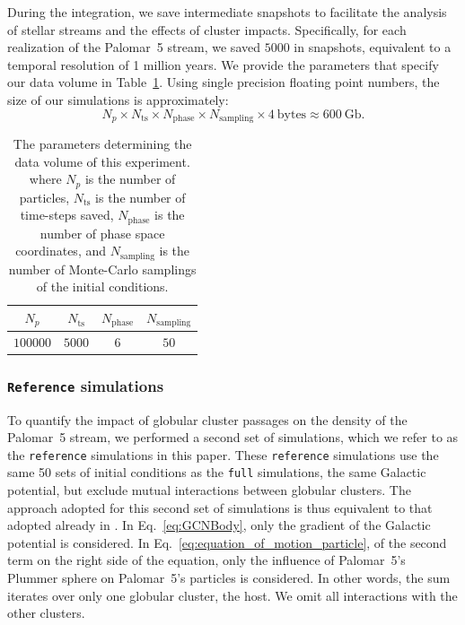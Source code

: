 \documentclass{aa}
\begin{document}
      During the integration, we save intermediate snapshots to facilitate the analysis of stellar streams and the effects of cluster impacts. Specifically, for each realization of the Palomar~5 stream, we saved $5000$ in snapshots, equivalent to a temporal resolution of 1 million years. We provide the parameters that specify our data volume in Table~\ref{tab:data_volume}. Using single precision floating point numbers, the size of our simulations is approximately:
    \begin{equation} \label{eq:data_volume_estimate}
      N_p \times N_{\textrm{ts}}\times N_{\textrm{phase}}\times N_{\textrm{sampling}} \times 4~\textrm{bytes}\approx 600~\textrm{Gb}.
    \end{equation}

    \begin{table}[h]
      \centering
      \begin{tabular}{|c|c|c|c|}
          \hline
          $N_p$ & $N_{\textrm{ts}}$ & $N_{\textrm{phase}}$ & $N_{\textrm{sampling}}$ \\
          \hline
          $100000$ & $5000$ & $6$ & $50$ \\
          \hline
      \end{tabular}
      \caption{The parameters determining the data volume of this experiment. where $N_p$  is the number of particles, $N_{\textrm{ts}}$ is the number of time-steps saved, $N_{\textrm{phase}}$ is the number of phase space coordinates, and $N_{\textrm{sampling}}$ is the number of Monte-Carlo samplings of the initial conditions.}
      \label{tab:data_volume}
    \end{table}

  \subsubsection{ \texttt{Reference} simulations}

    To quantify the impact of globular cluster passages on the density of the Palomar~5 stream, we performed a second set of simulations, which we refer to as the \texttt{reference} simulations in this paper.  These \texttt{reference} simulations use the same 50 sets of initial conditions as the \texttt{full} simulations, the same Galactic potential, but exclude mutual interactions between globular clusters. The approach adopted for this second set of simulations is thus equivalent to that adopted already in \citet{2023A&A...673A..44F}. In Eq.~\ref{eq:GCNBody}, only the gradient of the Galactic potential is considered. In Eq.~\ref{eq:equation_of_motion_particle}, of the second term on the right side of the equation, only the influence of Palomar~5's Plummer sphere on Palomar~5's particles is considered. In other words, the sum iterates over only one globular cluster, the host. We omit all interactions with the other clusters.
\end{document}
